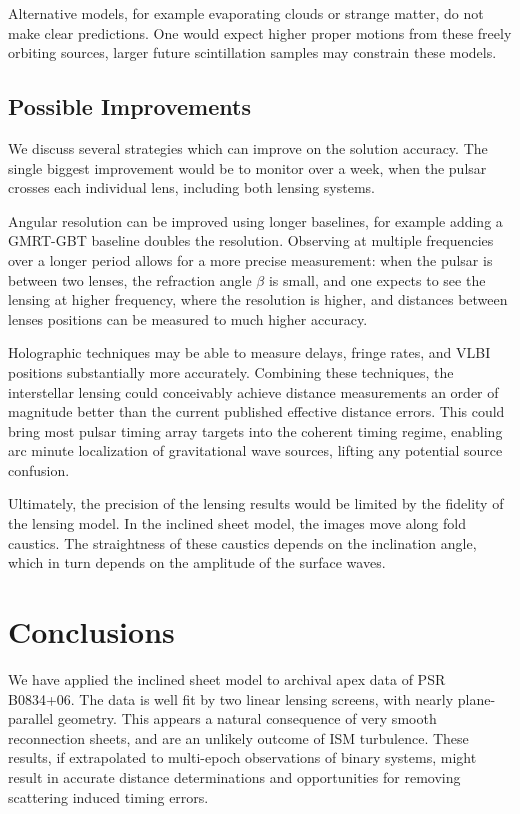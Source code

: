 \documentclass[useAMS,usenatbib]{mn2e}
\begin{document}
Alternative models, for example evaporating
clouds\citep{1998ApJ...498L.125W} or strange
matter\citep{2013PhLB..727..357P}, do not make clear predictions.  One
would expect higher proper motions from these freely orbiting sources,
larger future scintillation samples may constrain these models.



\subsection{Possible Improvements}

We discuss several strategies which can improve on the solution
accuracy.  The single biggest improvement would be to monitor over a
week, when the pulsar crosses each individual lens, including both
lensing systems.

Angular resolution can be improved using longer baselines, for example
adding a GMRT-GBT baseline doubles the resolution.  Observing at
multiple frequencies over a longer period allows for a more precise
measurement: when the pulsar is between two lenses, the refraction
angle $\beta$ is small, and one expects to see the lensing at higher
frequency, where the resolution is higher, and distances between
lenses positions can be measured to much higher accuracy.

Holographic techniques \citep{2008MNRAS.388.1214W,2014MNRAS.440L..36P}
may be able to measure delays, fringe rates, and VLBI positions
substantially more accurately.  Combining these techniques, the
interstellar lensing could conceivably achieve distance measurements
an order of magnitude better than the current published effective
distance errors.  This could bring most pulsar timing array targets
into the coherent timing regime, enabling arc minute localization of
gravitational wave sources, lifting any potential source confusion.

Ultimately, the precision of the lensing results would be limited by
the fidelity of the lensing model.  In the inclined sheet model, the
images move along fold caustics.  The straightness of these caustics
depends on the inclination angle, which in turn depends on the
amplitude of the surface waves.  

\section{Conclusions}

We have applied the \citep{2014MNRAS.442.3338P} inclined
sheet model to archival apex data of PSR B0834+06.  The data is well
fit by two linear lensing screens, with nearly plane-parallel
geometry.  This appears a natural consequence of very smooth
reconnection sheets, and are an unlikely outcome of ISM turbulence.
These results, if extrapolated to multi-epoch observations of binary
systems, might result in accurate distance determinations and
opportunities for removing scattering induced timing errors.
\end{document}
